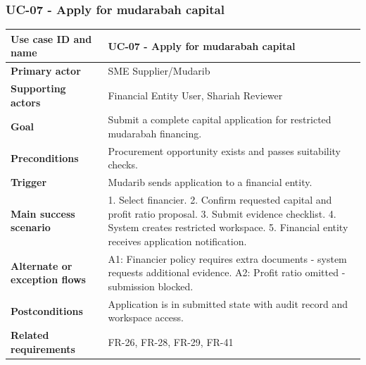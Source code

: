 \documentclass[11pt,a4paper]{article}
\begin{document}
\subsubsection{UC-07 - Apply for mudarabah capital}
\begin{footnotesize}
\begin{longtable}{@{}p{}p{}@{}}
\rowcolor{gray!10}\textbf{Use case ID and name} & UC-07 - Apply for mudarabah capital \\ \hline
\rowcolor{gray!10}\textbf{Primary actor} & SME Supplier/Mudarib \\ \hline
\rowcolor{gray!10}\textbf{Supporting actors} & Financial Entity User, Shariah Reviewer \\ \hline
\rowcolor{gray!10}\textbf{Goal} & Submit a complete capital application for restricted mudarabah financing. \\ \hline
\rowcolor{gray!10}\textbf{Preconditions} & Procurement opportunity exists and passes suitability checks. \\ \hline
\rowcolor{gray!10}\textbf{Trigger} & Mudarib sends application to a financial entity. \\ \hline
\rowcolor{gray!10}\textbf{Main success scenario} & 1. Select financier. 2. Confirm requested capital and profit ratio proposal. 3. Submit evidence checklist. 4. System creates restricted workspace. 5. Financial entity receives application notification. \\ \hline
\rowcolor{gray!10}\textbf{Alternate or exception flows} & A1: Financier policy requires extra documents - system requests additional evidence. A2: Profit ratio omitted - submission blocked. \\ \hline
\rowcolor{gray!10}\textbf{Postconditions} & Application is in submitted state with audit record and workspace access. \\ \hline
\rowcolor{gray!10}\textbf{Related requirements} & FR-26, FR-28, FR-29, FR-41 \\ \hline
\end{longtable}
\end{footnotesize}
\end{document}
